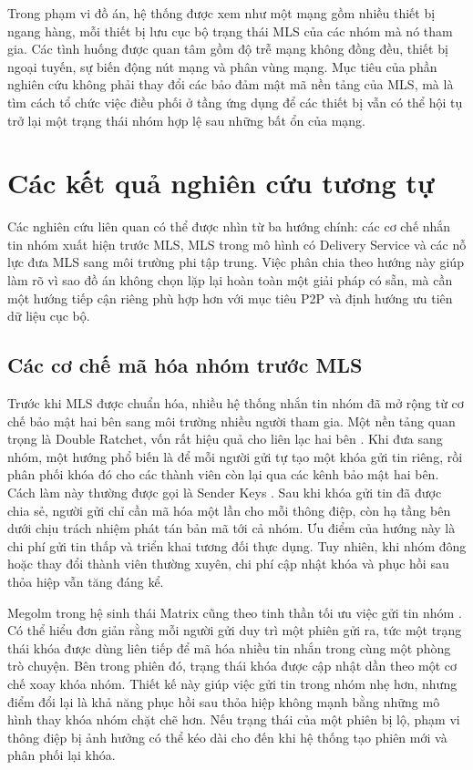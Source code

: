 \documentclass[../DoAn.tex]{subfiles}
\begin{document}
Trong phạm vi đồ án, hệ thống được xem như một mạng gồm nhiều thiết bị ngang hàng, mỗi thiết bị lưu cục bộ trạng thái MLS của các nhóm mà nó tham gia. Các tình huống được quan tâm gồm độ trễ mạng không đồng đều, thiết bị ngoại tuyến, sự biến động nút mạng và phân vùng mạng. Mục tiêu của phần nghiên cứu không phải thay đổi các bảo đảm mật mã nền tảng của MLS, mà là tìm cách tổ chức việc điều phối ở tầng ứng dụng để các thiết bị vẫn có thể hội tụ trở lại một trạng thái nhóm hợp lệ sau những bất ổn của mạng.

\section{Các kết quả nghiên cứu tương tự}
\label{sec:nghien-cuu-lien-quan}

Các nghiên cứu liên quan có thể được nhìn từ ba hướng chính: các cơ chế nhắn tin nhóm xuất hiện trước MLS, MLS trong mô hình có Delivery Service và các nỗ lực đưa MLS sang môi trường phi tập trung. Việc phân chia theo hướng này giúp làm rõ vì sao đồ án không chọn lặp lại hoàn toàn một giải pháp có sẵn, mà cần một hướng tiếp cận riêng phù hợp hơn với mục tiêu P2P và định hướng ưu tiên dữ liệu cục bộ.

\subsection{Các cơ chế mã hóa nhóm trước MLS}

Trước khi MLS được chuẩn hóa, nhiều hệ thống nhắn tin nhóm đã mở rộng từ cơ chế bảo mật hai bên sang môi trường nhiều người tham gia. Một nền tảng quan trọng là Double Ratchet, vốn rất hiệu quả cho liên lạc hai bên \cite{perrin2025doubleratchet}. Khi đưa sang nhóm, một hướng phổ biến là để mỗi người gửi tự tạo một khóa gửi tin riêng, rồi phân phối khóa đó cho các thành viên còn lại qua các kênh bảo mật hai bên. Cách làm này thường được gọi là Sender Keys \cite{balbas2023senderkeys}. Sau khi khóa gửi tin đã được chia sẻ, người gửi chỉ cần mã hóa một lần cho mỗi thông điệp, còn hạ tầng bên dưới chịu trách nhiệm phát tán bản mã tới cả nhóm. Ưu điểm của hướng này là chi phí gửi tin thấp và triển khai tương đối thực dụng. Tuy nhiên, khi nhóm đông hoặc thay đổi thành viên thường xuyên, chi phí cập nhật khóa và phục hồi sau thỏa hiệp vẫn tăng đáng kể.

Megolm trong hệ sinh thái Matrix cũng theo tinh thần tối ưu việc gửi tin nhóm \cite{ginesin2024matrix}. Có thể hiểu đơn giản rằng mỗi người gửi duy trì một phiên gửi ra, tức một trạng thái khóa được dùng liên tiếp để mã hóa nhiều tin nhắn trong cùng một phòng trò chuyện. Bên trong phiên đó, trạng thái khóa được cập nhật dần theo một cơ chế xoay khóa nhóm. Thiết kế này giúp việc gửi tin trong nhóm nhẹ hơn, nhưng điểm đổi lại là khả năng phục hồi sau thỏa hiệp không mạnh bằng những mô hình thay khóa nhóm chặt chẽ hơn. Nếu trạng thái của một phiên bị lộ, phạm vi thông điệp bị ảnh hưởng có thể kéo dài cho đến khi hệ thống tạo phiên mới và phân phối lại khóa.
\end{document}
